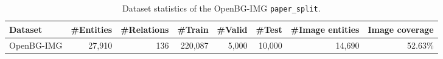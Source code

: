 \begin{table}[t]
\centering
\caption{Dataset statistics of the OpenBG-IMG \texttt{paper\_split}.}
\label{tab:dataset_statistics}
\small
\setlength{\tabcolsep}{4pt}
\begin{tabular}{lrrrrrrr}
\toprule
Dataset & \#Entities & \#Relations & \#Train & \#Valid & \#Test & \#Image entities & Image coverage \\
\midrule
OpenBG-IMG & 27{,}910 & 136 & 220{,}087 & 5{,}000 & 10{,}000 & 14{,}690 & 52.63\% \\
\bottomrule
\end{tabular}
\end{table}
